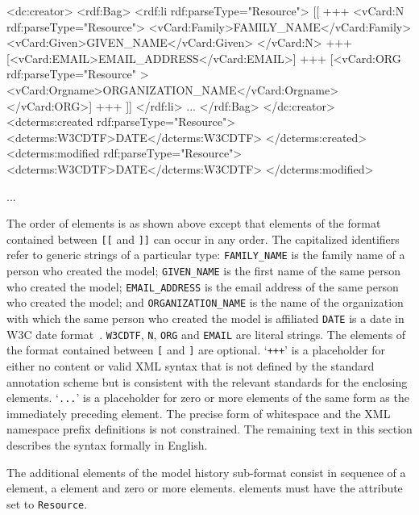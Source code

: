 \begin{blockChanged}

\begin{example}
<dc:creator>
  <rdf:Bag>
    <rdf:li rdf:parseType="Resource">
      [[
      +++
      <vCard:N rdf:parseType="Resource">
        <vCard:Family>FAMILY_NAME</vCard:Family>
        <vCard:Given>GIVEN_NAME</vCard:Given>
      </vCard:N>
      +++
      [<vCard:EMAIL>EMAIL_ADDRESS</vCard:EMAIL>]
      +++
      [<vCard:ORG rdf:parseType="Resource" >
        <vCard:Orgname>ORGANIZATION_NAME</vCard:Orgname>
      </vCard:ORG>]
      +++
      ]]
    </rdf:li>
    ...
  </rdf:Bag>
</dc:creator>
<dcterms:created rdf:parseType="Resource">
  <dcterms:W3CDTF>DATE</dcterms:W3CDTF>
</dcterms:created>
<dcterms:modified rdf:parseType="Resource">
  <dcterms:W3CDTF>DATE</dcterms:W3CDTF>
</dcterms:modified>
\end{example}
...

\end{blockChanged}

The order of elements is as shown above except that elements of
the format contained between \texttt{[[} and \texttt{]]} can occur
in any order.  The capitalized identifiers refer to generic
strings of a particular type: \texttt{FAMILY\_NAME} is the family
name of a person who created the model; \texttt{GIVEN\_NAME} is
the first name of the same person who created the model;
\texttt{EMAIL\_ADDRESS} is the email address of the same person
who created the model; and \texttt{ORGANIZATION\_NAME} is the name
of the organization with which the same person who created the
model is affiliated \texttt{DATE} is a date in W3C date
format~\citep{wolf:1998}. \texttt{W3CDTF}, \texttt{N},
\texttt{ORG} and \texttt{EMAIL} are literal strings. The elements
of the format contained between \texttt{[} and \texttt{]} are
optional. `\texttt{+++}' is a placeholder for either no content or
valid XML syntax that is not defined by the standard annotation
scheme but is consistent with the relevant standards for the
enclosing elements. `\texttt{...}' is a placeholder for zero or
more elements of the same form as the immediately preceding
element. The precise form of whitespace and the XML namespace
prefix definitions is not constrained.  The remaining text in this
section describes the syntax formally in English.

The additional elements of the model history sub-format consist in
sequence of a  element, a
 element and zero or more
 elements.   elements must have
the attribute  set to \texttt{Resource}.

